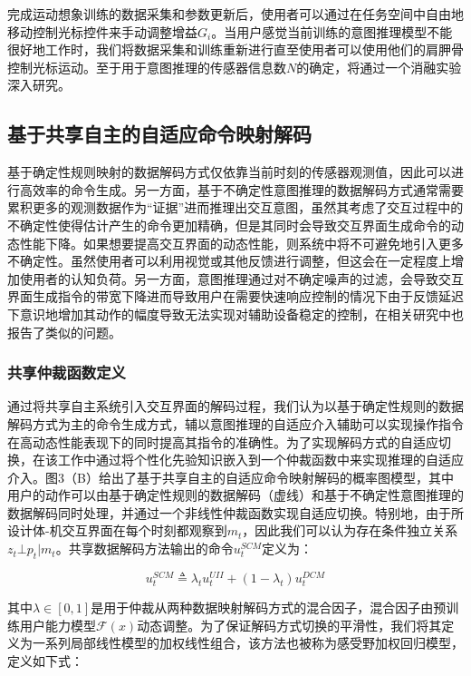 完成运动想象训练的数据采集和参数更新后，使用者可以通过在任务空间中自由地移动控制光标控件来手动调整增益${G_i}$。当用户感觉当前训练的意图推理模型不能很好地工作时，我们将数据采集和训练重新进行直至使用者可以使用他们的肩胛骨控制光标运动。至于用于意图推理的传感器信息数$N$的确定，将通过一个消融实验深入研究。  

\subsection{基于共享自主的自适应命令映射解码}  基于确定性规则映射的数据解码方式仅依靠当前时刻的传感器观测值，因此可以进行高效率的命令生成。另一方面，基于不确定性意图推理的数据解码方式通常需要累积更多的观测数据作为``证据''进而推理出交互意图，虽然其考虑了交互过程中的不确定性使得估计产生的命令更加精确，但是其同时会导致交互界面生成命令的动态性能下降。如果想要提高交互界面的动态性能，则系统中将不可避免地引入更多不确定性。虽然使用者可以利用视觉或其他反馈进行调整，但这会在一定程度上增加使用者的认知负荷。另一方面，意图推理通过对不确定噪声的过滤，会导致交互界面生成指令的带宽下降进而导致用户在需要快速响应控制的情况下由于反馈延迟下意识地增加其动作的幅度导致无法实现对辅助设备稳定的控制，在相关研究\cite{seanez-gonzalezStaticDynamicDecoding2017}中也报告了类似的问题。

\subsubsection{共享仲裁函数定义} 
通过将共享自主系统引入交互界面的解码过程，我们认为以基于确定性规则的数据解码方式为主的命令生成方式，辅以意图推理的自适应介入辅助可以实现操作指令在高动态性能表现下的同时提高其指令的准确性。为了实现解码方式的自适应切换，在该工作中通过将个性化先验知识嵌入到一个仲裁函数中来实现推理的自适应介入。图3（B）给出了基于共享自主的自适应命令映射解码的概率图模型，其中用户的动作可以由基于确定性规则的数据解码（虚线）和基于不确定性意图推理的数据解码同时处理，并通过一个非线性仲裁函数实现自适应切换。特别地，由于所设计体-机交互界面在每个时刻都观察到${m_t}$，因此我们可以认为存在条件独立关系${z_t} \bot {p_t}|{m_t}$。共享数据解码方法输出的命令$u_t^{SCM}$定义为：

\begin{equation}
    \label{ex6}
    u_t^{SCM}\triangleq \lambda_t u_t^{UII}+(1-\lambda_t)u_t^{DCM}
\end{equation}   

其中$\lambda  \in [0,1]$是用于仲裁从两种数据映射解码方式的混合因子，混合因子由预训练用户能力模型$\mathcal{F} (x)$动态调整。为了保证解码方式切换的平滑性，我们将其定义为一系列局部线性模型的加权线性组合，该方法也被称为感受野加权回归模型\cite{schaalScalableTechniquesNonparametric2002}，定义如下式：

